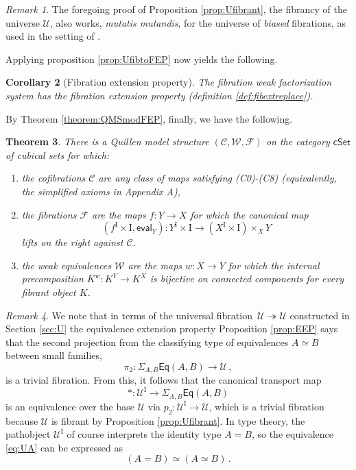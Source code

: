 \documentclass[11pt,reqno]{amsart}
\newcommand{\CC}{\ensuremath{\mathcal{C}}}
\newcommand{\WW}{\ensuremath{\mathcal{W}}}
\newcommand{\FF}{\ensuremath{\mathcal{F}}}
\newcommand{\cSet}{\ensuremath{\mathsf{cSet}}}
\newcommand{\eval}{\ensuremath{\mathsf{eval}}}%
\newcommand{\ra}{\ensuremath{\rightarrow}}
\newcommand{\fib}{\ensuremath{\twoheadrightarrow}}
\renewcommand{\to}{\ensuremath{\rightarrow}}
\newcommand{\too}{\ensuremath{\longrightarrow}}
\newcommand{\I}{\ensuremath{\mathrm{I}}}
\newcommand{\U}{\ensuremath{\mathcal{U}}}
\newcommand{\UU}{\ensuremath{\,\dot{\mathcal{U}}}}
\newtheorem{theorem}{Theorem}
\newtheorem{corollary}[theorem]{Corollary}
\theoremstyle{remark}
\newtheorem{remark}[theorem]{Remark}
\theoremstyle{definition}
\begin{document}
\begin{remark}
The foregoing proof of Proposition \ref{prop:Ufibrant}, the fibrancy of the universe $\U$, also works, \emph{mutatis mutandis}, for the universe of \emph{biased} fibrations, as used in the setting of \cite{CCHM:2018ctt}.
\end{remark}

Applying proposition \ref{prop:UfibtoFEP} now yields the following.

\begin{corollary}[Fibration extension property]\label{cor:FEP}
The fibration weak factorization system has the fibration extension property (definition \ref{def:fibextreplace}). 
\end{corollary}

By Theorem \ref{theorem:QMSmodFEP}, finally, we have the following.

\begin{theorem}\label{theorem:QMS}
There is a Quillen model structure $(\CC,\WW,\FF)$ on the category $\cSet$ of cubical sets for which:
\begin{enumerate}
\item the cofibrations $\CC$ are any class of maps satisfying (C0)-(C8) (equivalently, the simplified axioms in  Appendix A),
\item the fibrations $\FF$ are the maps $f : Y\ra X$ for which the canonical map 
\[
(f^\I \times \I, \eval_Y) : Y^\I \times \I\too (X^\I \times \I)\times_X Y
\]
lifts on the right against $\CC$.
\item the weak equivalences $\WW$ are the maps $w : X\ra Y$  for which the internal precomposition $K^w : K^Y \to K^X$ is bijective on connected components for every fibrant object $K$.
\end{enumerate}
\end{theorem}


\begin{remark}
We note that in terms of the universal fibration $\UU\fib\U$ constructed in Section \ref{sec:U} the equivalence extension property Proposition \ref{prop:EEP} says that the second projection from the classifying type of equivalences $A\simeq B$ between small families, 
\[
\pi_2 : \Sigma_{A,B}\mathsf{Eq}(A,B) \too \U \,,
\]
is a trivial fibration.  From this, it follows that the canonical transport map 
\begin{equation}\label{eq:UA}
* : \U^\I \too \Sigma_{A,B}\mathsf{Eq}(A,B)
\end{equation}
 is an equivalence over the base $\U$ via $p_2: \U^\I \to \U$, which is a trivial fibration because $\U$ is fibrant by Proposition \ref{prop:Ufibrant}.  In type theory, the pathobject $\U^\I$ of course interprets the identity type $A=B$, so the equivalence \eqref{eq:UA} can be expressed as 
 \[
 (A=B)\simeq(A\simeq B)\,.
 \]
 \end{remark}
\end{document}
